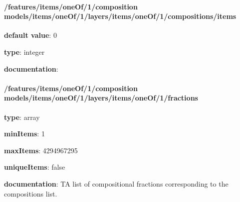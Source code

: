 \begin{itemized}
\paragraph{/features/items/oneOf/1/composition models/items/oneOf/1/layers/items/oneOf/1/compositions/items} \begin{itemized}
\item {\bf default value}: 0
\item {\bf type}: integer
\item {\bf documentation}: 
\end{itemized}\end{itemized}\paragraph{/features/items/oneOf/1/composition models/items/oneOf/1/layers/items/oneOf/1/fractions} \begin{itemized}
\item {\bf type}: array
\item {\bf minItems}: 1
\item {\bf maxItems}: 4294967295
\item {\bf uniqueItems}: false
\item {\bf documentation}: TA list of compositional fractions corresponding to the compositions list.

\end{itemized}

